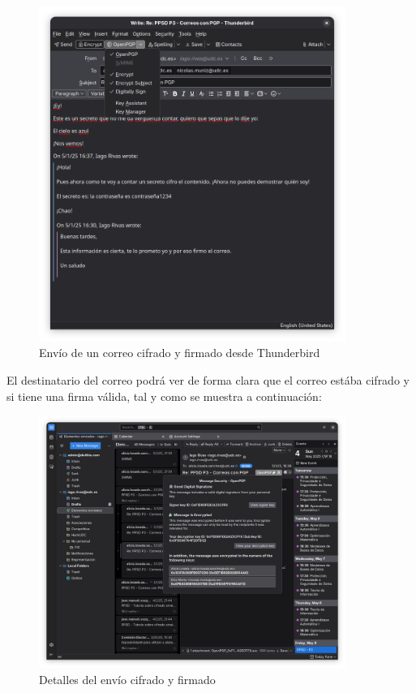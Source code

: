 \begin{figure}[H]
    \centering
    \includegraphics[width=10cm]{thunderbird-cifrado-firmado.png}
    \caption{Envío de un correo cifrado y firmado desde Thunderbird}
\end{figure}

El destinatario del correo podrá ver de forma clara que el correo estába cifrado y si tiene una firma válida, tal y como se muestra a continuación:

\begin{figure}[H]
    \centering
    \includegraphics[width=10cm]{thunderbird-detalles.png}
    \caption{Detalles del envío cifrado y firmado}
\end{figure}